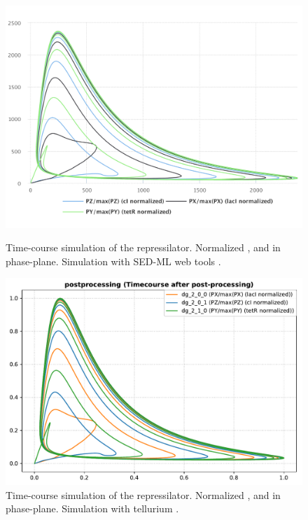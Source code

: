 \begin{figure}[ht]
    \centering
    \begin{minipage}{0.47\textwidth}
        \centering
        \includegraphics[width=1.0\textwidth]{examples/repressilator/results/sedml_webtools/postprocessing}
        \caption{Time-course simulation of the repressilator. Normalized ,  and  in phase-plane. Simulation with SED-ML web tools \citep{bergmann2017sed}.}
        \label{fig:rep_post1}
    \end{minipage}\hfill
    \begin{minipage}{0.47\textwidth}
        \centering
        \includegraphics[width=1.0\textwidth]{examples/repressilator/results/tellurium/postprocessing}
        \caption{Time-course simulation of the repressilator. Normalized ,  and  in phase-plane. Simulation with tellurium \citep{tellurium}.}
        \label{fig:rep_post2}
    \end{minipage}
\end{figure}
